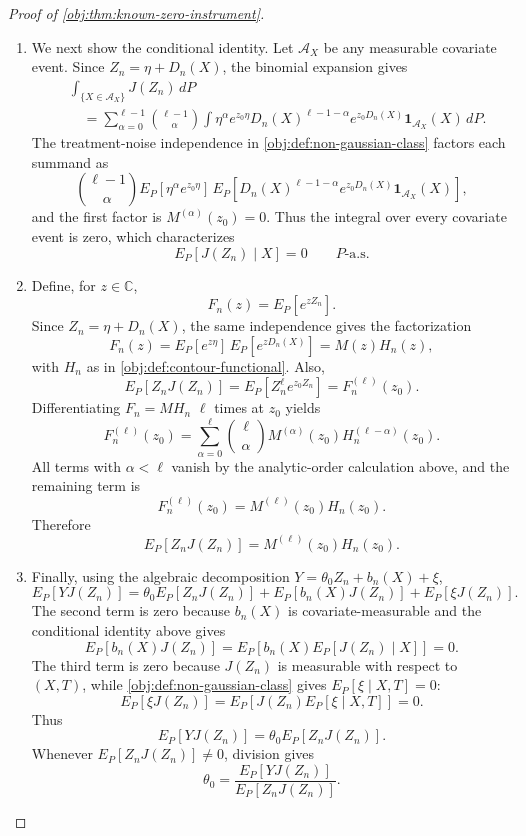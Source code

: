 \begin{proof}[Proof of \cref{obj:thm:known-zero-instrument}]
\begin{enumerate}
\item We next show the conditional identity. Let \(\mathcal A_X\) be any measurable covariate event. Since \(Z_n=\eta+D_n(X)\), the binomial expansion gives
\[
\begin{aligned}
&\int_{\{X\in\mathcal A_X\}} J(Z_n)\,dP  \\
&\quad =
\sum_{\alpha=0}^{\ell-1}
\binom{\ell-1}{\alpha}
\int
\eta^\alpha e^{z_0\eta}
D_n(X)^{\ell-1-\alpha}e^{z_0D_n(X)}
\mathbf 1_{\mathcal A_X}(X)\,dP .
\end{aligned}
\]
The treatment-noise independence in \cref{obj:def:non-gaussian-class} factors each summand as
\[
\binom{\ell-1}{\alpha}
E_P\!\left[\eta^\alpha e^{z_0\eta}\right]\,
E_P\!\left[
D_n(X)^{\ell-1-\alpha}e^{z_0D_n(X)}
\mathbf 1_{\mathcal A_X}(X)
\right],
\]
and the first factor is \(M^{(\alpha)}(z_0)=0\). Thus the integral over every covariate event is zero, which characterizes
\[
E_P[J(Z_n)\mid X]=0
\qquad P\text{-a.s.}
\]

\item Define, for \(z\in\mathbb C\),
\[
F_n(z)=E_P[e^{zZ_n}].
\]
Since \(Z_n=\eta+D_n(X)\), the same independence gives the factorization
\[
F_n(z)=E_P[e^{z\eta}]\,E_P[e^{zD_n(X)}]=M(z)H_n(z),
\]
with \(H_n\) as in \cref{obj:def:contour-functional}. Also,
\[
E_P[Z_nJ(Z_n)]
=
E_P[Z_n^\ell e^{z_0Z_n}]
=
F_n^{(\ell)}(z_0).
\]
Differentiating \(F_n=MH_n\) \(\ell\) times at \(z_0\) yields
\[
F_n^{(\ell)}(z_0)
=
\sum_{\alpha=0}^{\ell}
\binom{\ell}{\alpha}
M^{(\alpha)}(z_0)H_n^{(\ell-\alpha)}(z_0).
\]
All terms with \(\alpha<\ell\) vanish by the analytic-order calculation above, and the remaining term is
\[
F_n^{(\ell)}(z_0)=M^{(\ell)}(z_0)H_n(z_0).
\]
Therefore
\[
E_P[Z_nJ(Z_n)]
=
M^{(\ell)}(z_0)H_n(z_0).
\]

\item Finally, using the algebraic decomposition \(Y=\theta_0Z_n+b_n(X)+\xi\),
\[
E_P[YJ(Z_n)]
=
\theta_0E_P[Z_nJ(Z_n)]
+
E_P[b_n(X)J(Z_n)]
+
E_P[\xi J(Z_n)] .
\]
The second term is zero because \(b_n(X)\) is covariate-measurable and the conditional identity above gives
\[
E_P[b_n(X)J(Z_n)]
=
E_P\!\left[b_n(X)E_P[J(Z_n)\mid X]\right]
=0 .
\]
The third term is zero because \(J(Z_n)\) is measurable with respect to \((X,T)\), while \cref{obj:def:non-gaussian-class} gives \(E_P[\xi\mid X,T]=0\):
\[
E_P[\xi J(Z_n)]
=
E_P\!\left[J(Z_n)E_P[\xi\mid X,T]\right]
=0 .
\]
Thus
\[
E_P[YJ(Z_n)]
=
\theta_0E_P[Z_nJ(Z_n)] .
\]
Whenever \(E_P[Z_nJ(Z_n)]\ne0\), division gives
\[
\theta_0
=
\frac{E_P[YJ(Z_n)]}{E_P[Z_nJ(Z_n)]}.
\]
\end{enumerate}
\end{proof}

